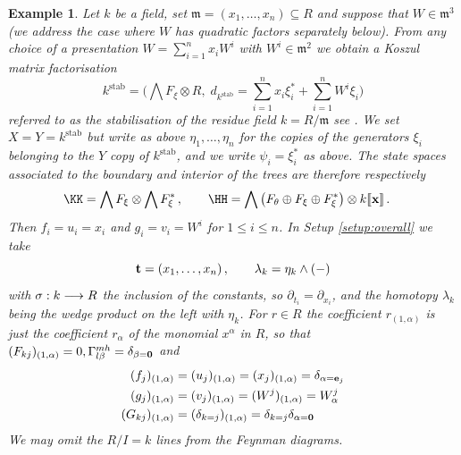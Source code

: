\documentclass[english,letter paper,12pt,leqno]{article}
\theoremstyle{example}
\newtheorem{example}[theorem]{Example}
\numberwithin{equation}{section}
\def\stab{\operatorname{stab}}
\begin{document}
\begin{example}\label{example:stabkpre} Let $k$ be a field, set $\mathfrak{m} = (x_1,\ldots,x_n) \subseteq R$ and suppose that $W \in \mathfrak{m}^3$ (we address the case where $W$ has quadratic factors separately below). From any choice of a presentation $W = \sum_{i=1}^n x_i W^i$ with $W^i \in \mathfrak{m}^2$ we obtain a Koszul matrix factorisation
\begin{equation}\label{eq:kstab}
k^{\operatorname{stab}} = \Big( \bigwedge F_\xi \otimes R, \;d_{k^{\stab}} = \sum_{i=1}^n x_i \xi_i^* + \sum_{i=1}^n W^i \xi_i \Big)
\end{equation}
referred to as the \emph{stabilisation} of the residue field $k = R / \mathfrak{m}$ see \cite{??}. We set $X = Y = k^{\stab}$ but write as above $\eta_1,\ldots,\eta_n$ for the copies of the generators $\xi_i$ belonging to the $Y$ copy of $k^{\stab}$, and we write $\psi_i = \xi_i^*$ as above. The state spaces associated to the boundary and interior of the trees are therefore respectively
\begin{align*}
\KK &= \bigwedge F_\xi \otimes \bigwedge F_\xi^*\,, \qquad \HH = \bigwedge \big( F_\theta \oplus F_\xi \oplus F_\xi^* \big) \otimes k\llbracket \bold{x} \rrbracket\,.
\end{align*}
Then $f_i = u_i = x_i$ and $g_i = v_i = W^i$ for $1 \le i \le n$. In Setup \ref{setup:overall} we take
\[
\bold{t} = (x_1,\ldots,x_n)\,, \qquad \lambda_k = \eta_k \wedge (-)
\]
with $\sigma: k \longrightarrow R$ the inclusion of the constants, so $\partial_{t_i} = \partial_{x_i}$, and the homotopy $\lambda_k$ being the wedge product on the left with $\eta_k$. For $r \in R$ the coefficient $r_{(1,\alpha)}$ is just the coefficient $r_\alpha$ of the monomial $x^\alpha$ in $R$, so that $(F_{kj})_{(1,\alpha)} = 0, \Gamma^{mh}_{l \beta} = \delta_{\beta = \bold{0}}$ and
\begin{align*}
(f_j)_{(1,\alpha)} &= (u_j)_{(1,\alpha)} = (x_j)_{(1,\alpha)} = \delta_{\alpha = \bold{e}_j}\\
(g_j)_{(1,\alpha)} &= (v_j)_{(1,\alpha)} = (W^j)_{(1,\alpha)} = W^j_{\alpha}\\
(G_{kj})_{(1,\alpha)} &= (\delta_{k=j})_{(1,\alpha)} = \delta_{k=j} \delta_{\alpha = \bold{0}}
\end{align*}
We may omit the $R/I = k$ lines from the Feynman diagrams. 

\end{example}
\end{document}
